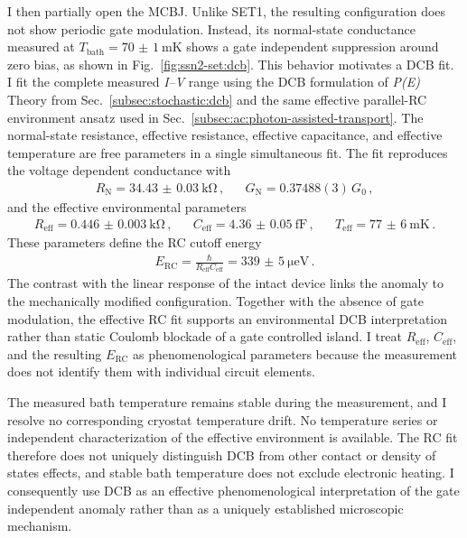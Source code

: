     I then partially open the MCBJ. Unlike SET1, the resulting configuration does not show periodic gate modulation. Instead, its normal-state conductance measured at $T_\mathrm{bath}=\qty{70(1)}{\milli\kelvin}$ shows a gate independent suppression around zero bias, as shown in Fig.~\ref{fig:ssn2-set:dcb}. This behavior motivates a DCB fit. I fit the complete measured \textit{I--V} range using the DCB formulation of \textit{P(E)} Theory from Sec.~\ref{subsec:stochastic:dcb} and the same effective parallel-RC environment ansatz used in Sec.~\ref{subsec:ac:photon-assisted-transport}. The normal-state resistance, effective resistance, effective capacitance, and effective temperature are free parameters in a single simultaneous fit. The fit reproduces the voltage dependent conductance with
    \begin{align}
        R_\mathrm{N} = \qty{34.43(3)}{\kilo\ohm}\,, &&
        G_\mathrm{N} = 0.37488(3)\,G_0\,,
        \label{eq:ssn-set:dynamic:dcb-normal}
    \end{align}
    and the effective environmental parameters
    \begin{align}
        R_\mathrm{eff} = \qty{0.446(3)}{\kilo\ohm}\,, &&
        C_\mathrm{eff} = \qty{4.36(5)}{\femto\farad}\,, &&
        T_\mathrm{eff} = \qty{77(6)}{\milli\kelvin}\,.
        \label{eq:ssn-set:dynamic:dcb-environment}
    \end{align}
    These parameters define the RC cutoff energy
    \begin{align}
        E_\mathrm{RC} = \frac{\hbar}{R_\mathrm{eff}C_\mathrm{eff}} = \qty{339(5)}{\micro\electronvolt}\,.
        \label{eq:ssn-set:dynamic:dcb-cutoff}
    \end{align}
    The contrast with the linear response of the intact device links the anomaly to the mechanically modified configuration. Together with the absence of gate modulation, the effective RC fit supports an environmental DCB interpretation rather than static Coulomb blockade of a gate controlled island. I treat $R_\mathrm{eff}$, $C_\mathrm{eff}$, and the resulting $E_\mathrm{RC}$ as phenomenological parameters because the measurement does not identify them with individual circuit elements.

    The measured bath temperature remains stable during the measurement, and I resolve no corresponding cryostat temperature drift. No temperature series or independent characterization of the effective environment is available. The RC fit therefore does not uniquely distinguish DCB from other contact or density of states effects, and stable bath temperature does not exclude electronic heating. I consequently use DCB as an effective phenomenological interpretation of the gate independent anomaly rather than as a uniquely established microscopic mechanism.
    
